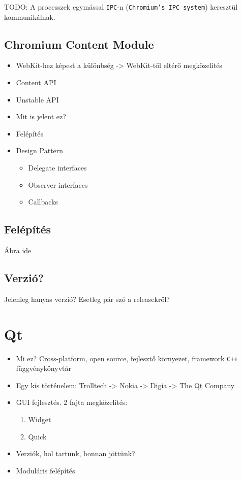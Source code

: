 \documentclass[12pt]{report}
\begin{document}
TODO: A processzek egymással \texttt{IPC}-n (\texttt{Chromium's IPC system})
keresztül kommunikálnak.


\subsection{Chromium Content Module}
\begin{itemize}
    \item WebKit-hez képest a különbség -> WebKit-től eltérő megközelítés
    \item Content API
    \item Unstable API
    \item Mit is jelent ez?
    \item Felépítés
    \item Design Pattern
        \begin{itemize}
            \item Delegate interfaces
            \item Observer interfaces
            \item Callbacks
        \end{itemize}
\end{itemize}

\subsection{Felépítés}
Ábra ide

\subsection{Verzió?}
Jelenleg hanyas verzió? Esetleg pár szó a releasekről?


\section{Qt}
\begin{itemize}
    \item Mi ez?
        \subitem Cross-platform, open source, fejlesztő környezet, framework
        \subitem \texttt{C++} függvénykönyvtár
    \item Egy kis történelem:
        \subitem Trolltech -> Nokia -> Digia -> The Qt Company
    \item GUI fejlesztés. 2 fajta megközelítés:
        \begin{enumerate}
            \item Widget
            \item Quick
        \end{enumerate}
    \item Verziók, hol tartunk, honnan jöttünk?
    \item Moduláris felépítés
\end{itemize}
\end{document}
